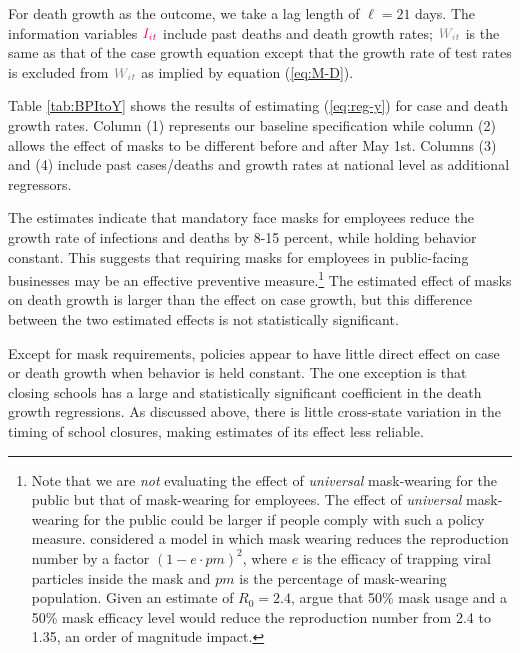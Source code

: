 \documentclass[11pt,reqno,letter]{amsart}
\theoremstyle{definition}
\def\icolor{\color{magenta}}
\def\wcolor{\color{gray}}
\begin{document}
For death growth as the outcome, we take a lag length of $\ell=21$ days. The information variables $\icolor I_{it}$ include  past deaths and death growth rates;  $\wcolor W_{it}$ is the same as that of the case growth equation except that the growth rate of test rates is excluded from $\wcolor W_{it}$ as implied by equation (\ref{eq:M-D}).



Table \ref{tab:BPItoY} shows
the results of estimating
(\ref{eq:reg-y}) for case and death growth rates. %
Column (1) represents our baseline specification while column (2) allows the effect of masks to be different before and after May 1st. Columns (3) and (4) include past cases/deaths and growth rates at national level as additional regressors.

The estimates indicate that mandatory face masks for employees
reduce the growth rate of infections and deaths by 8-15 percent, while holding behavior constant. This suggests that
requiring masks for employees in public-facing businesses may be an effective preventive measure.\footnote{Note that we are \textit{not} evaluating the effect of \textit{universal} mask-wearing for the public but that of mask-wearing for employees. The effect of \textit{universal} mask-wearing for the public could be larger if people comply with such a policy measure. \cite{tian2020calibrated} considered a  model in which mask wearing reduces  the reproduction number by a factor $(1-e \cdot pm)^2$, where $e$ is the efficacy of trapping viral particles inside the mask and $pm$ is the percentage of mask-wearing population. Given an estimate of $R_0=2.4$, \cite{howard2020} argue that  50\% mask usage and a 50\% mask efficacy level would reduce the reproduction number from 2.4 to 1.35, an order of magnitude
impact.} The estimated effect of masks on death growth is larger than the effect on case growth, but this difference between the two estimated effects is not statistically significant.

Except for mask requirements, policies appear to have little direct
effect on case or death growth when behavior is held constant. The one
exception is that closing schools has a large and statistically
significant coefficient in the death growth regressions. As discussed
above, there is little cross-state variation in the timing of school
closures, making estimates of its effect less reliable.
\end{document}
